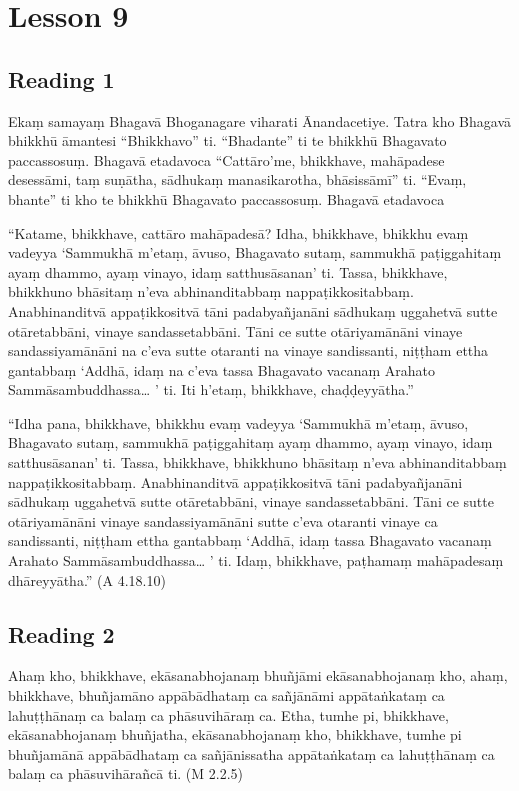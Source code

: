\chapter{Lesson 9}

\section*{Reading 1}

Ekaṃ samayaṃ Bhagavā Bhoganagare viharati Ānandacetiye. Tatra kho Bhagavā bhikkhū āmantesi “Bhikkhavo” ti. “Bhadante” ti te bhikkhū Bhagavato paccassosuṃ. Bhagavā etadavoca “Cattāro’me, bhikkhave, mahāpadese desessāmi, taṃ suṇātha, sādhukaṃ manasikarotha, bhāsissāmī” ti. “Evaṃ, bhante” ti kho te bhikkhū Bhagavato paccassosuṃ. Bhagavā etadavoca

“Katame, bhikkhave, cattāro mahāpadesā? Idha, bhikkhave, bhikkhu evaṃ vadeyya ‘Sammukhā m’etaṃ, āvuso, Bhagavato sutaṃ, sammukhā paṭiggahitaṃ ayaṃ dhammo, ayaṃ vinayo, idaṃ satthusāsanan’ ti. Tassa, bhikkhave, bhikkhuno bhāsitaṃ n’eva abhinanditabbaṃ nappaṭikkositabbaṃ. Anabhinanditvā appaṭikkositvā tāni padabyañjanāni sādhukaṃ uggahetvā sutte otāretabbāni, vinaye sandassetabbāni. Tāni ce sutte otāriyamānāni vinaye sandassiyamānāni na c’eva sutte otaranti na vinaye sandissanti, niṭṭham ettha gantabbaṃ ‘Addhā, idaṃ na c’eva tassa Bhagavato vacanaṃ Arahato Sammāsambuddhassa… ’ ti. Iti h’etaṃ, bhikkhave, chaḍḍeyyātha.”

“Idha pana, bhikkhave, bhikkhu evaṃ vadeyya ‘Sammukhā m’etaṃ, āvuso, Bhagavato sutaṃ, sammukhā paṭiggahitaṃ ayaṃ dhammo, ayaṃ vinayo, idaṃ satthusāsanan’ ti. Tassa, bhikkhave, bhikkhuno bhāsitaṃ n’eva abhinanditabbaṃ nappaṭikkositabbaṃ. Anabhinanditvā appaṭikkositvā tāni padabyañjanāni sādhukaṃ uggahetvā sutte otāretabbāni, vinaye sandassetabbāni. Tāni ce sutte otāriyamānāni vinaye sandassiyamānāni sutte c’eva otaranti vinaye ca sandissanti, niṭṭham ettha gantabbaṃ ‘Addhā, idaṃ tassa Bhagavato vacanaṃ Arahato Sammāsambuddhassa… ’ ti. Idaṃ, bhikkhave, paṭhamaṃ mahāpadesaṃ dhāreyyātha.” \hfill(A 4.18.10)

\section*{Reading 2}

Ahaṃ kho, bhikkhave, ekāsanabhojanaṃ bhuñjāmi ekāsanabhojanaṃ kho, ahaṃ, bhikkhave, bhuñjamāno appābādhataṃ ca sañjānāmi appātaṅkataṃ ca lahuṭṭhānaṃ ca balaṃ ca phāsuvihāraṃ ca. Etha, tumhe pi, bhikkhave, ekāsanabhojanaṃ bhuñjatha, ekāsanabhojanaṃ kho, bhikkhave, tumhe pi bhuñjamānā appābādhataṃ ca sañjānissatha appātaṅkataṃ ca lahuṭṭhānaṃ ca balaṃ ca phāsuvihārañcā ti. \hfill(M 2.2.5)

